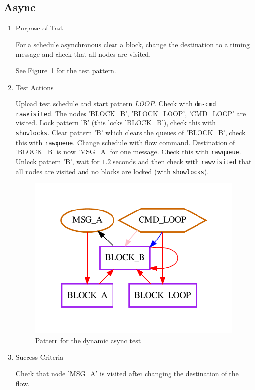 \documentclass[12pt,a4paper]{report}
\begin{document}
\subsection{Async}
\begin{enumerate}
	\item Purpose of Test

	For a schedule asynchronous clear a block, change the destination to a timing message and check that all nodes are visited.

	See Figure~\ref{fig:Pattern_for_the_dynamic_async_test} for the test pattern.
	\item Test Actions

	Upload test schedule and start pattern $LOOP$. Check with \texttt{dm-cmd rawvisited}. The 
	nodes 'BLOCK\_B', 'BLOCK\_LOOP', 'CMD\_LOOP' are visited. Lock pattern 'B' (this locks 'BLOCK\_B'), check this with 
	\texttt{showlocks}. Clear pattern 'B' which clears the queues of 'BLOCK\_B', check this with \texttt{rawqueue}. 
	Change schedule with flow command. Destination of 'BLOCK\_B' is now 'MSG\_A' for one message. Check this 
	with \texttt{rawqueue}. Unlock pattern 'B', wait for $1.2$ seconds and then check with \texttt{rawvisited} that all 
	nodes are visited and no blocks are locked (with \texttt{showlocks}).
    \begin{figure}
        \centering 
        \includegraphics{TestPattern/dynamic_async.pdf}
        \caption{Pattern for the dynamic async test}
        \label{fig:Pattern_for_the_dynamic_async_test}
    \end{figure}
	\item Success Criteria
	
	Check that node 'MSG\_A' is visited after changing the destination of the flow.
\end{enumerate}
\end{document}
